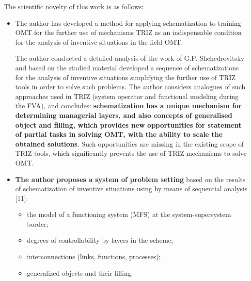 \documentclass[11pt,a4paper]{book}
\begin{document}
The scientific novelty of this work is as follows:
\begin{itemize}
\item The author has developed a method for applying schematization to
  training OMT for the further use of mechanisms TRIZ as an indispensable
  condition for the analysis of inventive situations in the field OMT.

  The author conducted a detailed analysis of the work of G.P. Shchedrovitsky
  and based on the studied material developed a sequence of schematizations
  for the analysis of inventive situations simplifying the further use of TRIZ
  tools in order to solve such problems. The author considers analogues of
  such approaches used in TRIZ (system operator and functional modeling during
  the FVA), and concludes: \textbf{schematization has a unique mechanism for
    determining managerial layers, and also concepts of generalised object and
    filling, which provides new opportunities for statement of partial tasks
    in solving OMT, with the ability to scale the obtained solutions}. Such
  opportunities are missing in the existing scope of TRIZ tools, which
  significantly prevents the use of TRIZ mechanisms to solve OMT.
\item \textbf{The author proposes a system of problem setting} based on the
  results of schematization of inventive situations using by means of
  sequential analysis [11]:
  \begin{itemize}
  \item the model of a functioning system (MFS) at the system-supersystem
    border;
  \item degrees of controllability by layers in the scheme;
  \item interconnections (links, functions, processes);
  \item generalized objects and their filling.
  \end{itemize}
  

\end{itemize}
\end{document}
